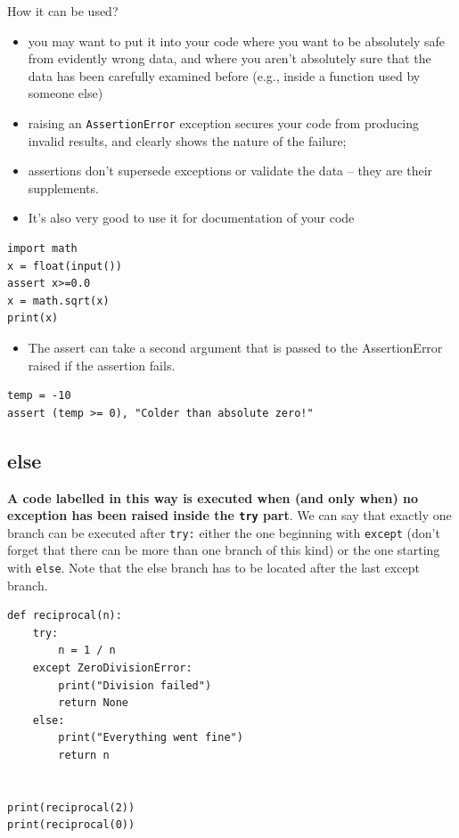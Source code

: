 \documentclass[11pt]{article}
\begin{document}
How it can be used?
\begin{itemize}
\item you may want to put it into your code where you want to be
absolutely safe from evidently wrong data, and where you aren’t
absolutely sure that the data has been carefully examined before
(e.g., inside a function used by someone else)
\item raising an \texttt{AssertionError} exception secures your code from producing
invalid results, and clearly shows the nature of the failure;
\item assertions don’t supersede exceptions or validate the data – they
are their supplements.
\item It's also very good to use it for documentation of your code
\end{itemize}

\begin{verbatim}
import math
x = float(input())
assert x>=0.0
x = math.sqrt(x)
print(x)
\end{verbatim}

\begin{itemize}
\item The assert can take a second argument that is passed to the
AssertionError raised if the assertion fails.
\end{itemize}

\begin{verbatim}
temp = -10
assert (temp >= 0), "Colder than absolute zero!"
\end{verbatim}

\subsection{else}
\label{sec:orgff4e76a}
\textbf{A code labelled in this way is executed when (and only when) no}
\textbf{exception has been raised inside the \texttt{try} part}.  We can say that
exactly one branch can be executed after \texttt{try:} either the one
beginning with \texttt{except} (don’t forget that there can be more than one
branch of this kind) or the one starting with \texttt{else}. Note that the
else branch has to be located after the last except branch.

\begin{verbatim}
def reciprocal(n):
	try:
		n = 1 / n
	except ZeroDivisionError:
		print("Division failed")
		return None
	else:
		print("Everything went fine")
		return n


print(reciprocal(2))
print(reciprocal(0))
\end{verbatim}
\end{document}
